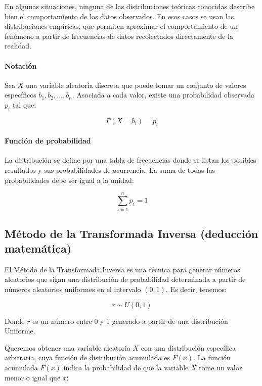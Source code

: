 \documentclass{article}
\begin{document}
En algunas situaciones, ninguna de las distribuciones teóricas conocidas describe bien el
comportamiento de los datos observados. En esos casos se usan las distribuciones
empíricas, que permiten aproximar el comportamiento de un fenómeno a partir de
frecuencias de datos recolectados directamente de la realidad.

\paragraph{Notación}

Sea $X$ una variable aleatoria discreta que puede tomar un conjunto de valores específicos
$b_1, b_2, \ldots, b_n$. Asociada a cada valor, existe una probabilidad observada $p_i$ tal que:

\begin{equation}
    P(X = b_i) = p_i
\end{equation}

\paragraph{Función de probabilidad}

La distribución se define por una tabla de frecuencias donde se listan los posibles
resultados y sus probabilidades de ocurrencia. La suma de todas las probabilidades debe
ser igual a la unidad:

\begin{equation}
    \sum_{i=1}^{n} p_i = 1
\end{equation}


\subsection{Método de la Transformada Inversa (deducción matemática)}

El Método de la Transformada Inversa es una técnica para generar números aleatorios que
sigan una distribución de probabilidad determinada a partir de números aleatorios uniformes
en el intervalo $(0,1)$. Es decir, tenemos:

\begin{equation}
    r \sim U(0, 1)
\end{equation}

Donde $r$ es un número entre 0 y 1 generado a partir de una distribución Uniforme.

Queremos obtener una variable aleatoria $X$ con una distribución específica arbitraria, cuya
función de distribución acumulada es $F(x)$. La función acumulada $F(x)$ indica la
probabilidad de que la variable $X$ tome un valor menor o igual que $x$:
\end{document}
